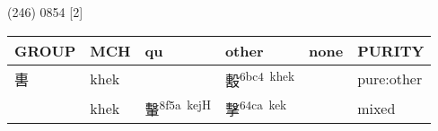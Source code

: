 \documentclass[14pt,a4paper]{scrartcl}
\begin{document}
(246) 0854 {[}2{]}

\begin{longtable}[c]{@{}llllll@{}}
\toprule
\begin{minipage}[b]{0.14\columnwidth}\raggedright\strut
GROUP
\strut\end{minipage} &
\begin{minipage}[b]{0.14\columnwidth}\raggedright\strut
MCH
\strut\end{minipage} &
\begin{minipage}[b]{0.14\columnwidth}\raggedright\strut
qu
\strut\end{minipage} &
\begin{minipage}[b]{0.14\columnwidth}\raggedright\strut
other
\strut\end{minipage} &
\begin{minipage}[b]{0.14\columnwidth}\raggedright\strut
none
\strut\end{minipage} &
\begin{minipage}[b]{0.14\columnwidth}\raggedright\strut
PURITY
\strut\end{minipage}\tabularnewline
\midrule
\endhead
\begin{minipage}[t]{0.14\columnwidth}\raggedright\strut
軎
\strut\end{minipage} &
\begin{minipage}[t]{0.14\columnwidth}\raggedright\strut
khek
\strut\end{minipage} &
\begin{minipage}[t]{0.14\columnwidth}\raggedright\strut
\strut\end{minipage} &
\begin{minipage}[t]{0.14\columnwidth}\raggedright\strut
毄\textsuperscript{6bc4~khek}
\strut\end{minipage} &
\begin{minipage}[t]{0.14\columnwidth}\raggedright\strut
\strut\end{minipage} &
\begin{minipage}[t]{0.14\columnwidth}\raggedright\strut
pure:other
\strut\end{minipage}\tabularnewline
\begin{minipage}[t]{0.14\columnwidth}\raggedright\strut
𣪠
\strut\end{minipage} &
\begin{minipage}[t]{0.14\columnwidth}\raggedright\strut
khek
\strut\end{minipage} &
\begin{minipage}[t]{0.14\columnwidth}\raggedright\strut
轚\textsuperscript{8f5a~kejH}
\strut\end{minipage} &
\begin{minipage}[t]{0.14\columnwidth}\raggedright\strut
擊\textsuperscript{64ca~kek}
\strut\end{minipage} &
\begin{minipage}[t]{0.14\columnwidth}\raggedright\strut
\strut\end{minipage} &
\begin{minipage}[t]{0.14\columnwidth}\raggedright\strut
mixed
\strut\end{minipage}\tabularnewline
\bottomrule
\end{longtable}
\end{document}
